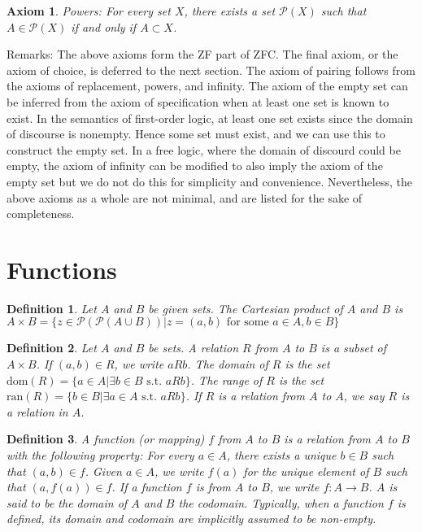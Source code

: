 \documentclass[a4paper]{article}
\newtheorem{axiom}{Axiom}
\newtheorem{mydef}{Definition}
\numberwithin{mytheorem}{section}
\numberwithin{mydef}{section}
\numberwithin{axiom}{section}
\numberwithin{example}{section}
\begin{document}
\begin{axiom} Powers: For every set $X$, there exists a set $\mathcal{P}(X)$ such that $A \in \mathcal{P}(X)$ if and only if $A \subset X$.
\end{axiom}

Remarks: The above axioms form the ZF part of ZFC. The final axiom, or the axiom of choice, is deferred to the next section. The axiom of pairing follows from the axioms of replacement, powers, and infinity. The axiom of the empty set can be inferred from the axiom of specification when at least one set is known to exist. In the semantics of first-order logic, at least one set exists since the domain of discourse is nonempty. Hence some set must exist, and we can use this to construct the empty set. In a free logic, where the domain of discourd could be empty, the axiom of infinity can be modified to also imply the axiom of the empty set but we do not do this for simplicity and convenience. Nevertheless, the above axioms as a whole are not minimal, and are listed for the sake of completeness. 

\section{Functions}

\begin{mydef} Let $A$ and $B$ be given sets. The Cartesian product of $A$ and $B$ is $A \times B = \{ z \in \mathcal{P}(\mathcal{P}(A \cup B)) | z = (a,b) \text{ for some } a \in A, b \in B \}$
\end{mydef}

\begin{mydef} Let $A$ and $B$ be sets. A relation $R$ from $A$ to $B$ is a subset of $A \times B$. If $(a,b) \in R$, we write $a R b$. The domain of $R$ is the set $\text{dom}(R)  = \{ a \in A | \exists b \in B \text{ s.t. } a R b\}$. The range of $R$ is the set  $\text{ran}(R)  = \{ b \in B | \exists a \in A \text{ s.t. } a R b\}$. If $R$ is a relation from $A$ to $A$, we say $R$ is a relation in $A$.
\end{mydef}

\begin{mydef} A function (or mapping) $f$ from $A$ to $B$ is a relation from $A$ to $B$ with the following property: For every $a \in A$, there exists a unique $b \in B$ such that $(a,b) \in f$. Given $a \in A$, we write $f(a)$  for the unique element of $B$ such that $(a,f(a)) \in f$. If a function $f$ is from $A$ to $B$, we write $f: A \rightarrow B$. $A$ is said to be the domain of $A$ and $B$ the codomain. Typically, when a function $f$ is defined, its domain and codomain are implicitly assumed to be non-empty.
\end{mydef}
\end{document}
